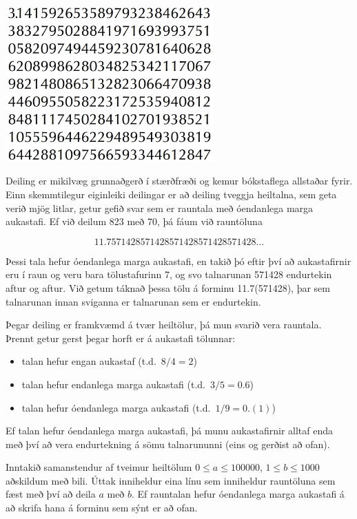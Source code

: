
\includegraphics[width=0.6\textwidth]{pi.jpg}

Deiling er mikilvæg grunnaðgerð í stærðfræði og kemur bókstaflega allstaðar
fyrir. Einn skemmtilegur eiginleiki deilingar er að deiling tveggja heiltalna,
sem geta verið mjög litlar, getur gefið svar sem er rauntala með óendanlega
marga aukastafi. Ef við deilum 823 með 70, þá fáum við rauntöluna

$$11.7571428571428571428571428571428\ldots$$

Þessi tala hefur óendanlega marga aukastafi, en takið þó eftir því að aukastafirnir
eru í raun og veru bara tölustafurinn 7, og svo talnarunan 571428 endurtekin
aftur og aftur. Við getum táknað þessa tölu á forminu 11.7(571428), þar sem
talnarunan innan sviganna er talnarunan sem er endurtekin.

Þegar deiling er framkvæmd á tvær heiltölur, þá mun svarið vera rauntala.
Þrennt getur gerst þegar horft er á aukastafi tölunnar:

\begin{itemize}
\item talan hefur engan aukastaf (t.d.\ $8/4 = 2$)
\item talan hefur endanlega marga aukastafi (t.d.\ $3/5 = 0.6$)
\item talan hefur óendanlega marga aukastafi (t.d.\ $1/9 = 0.(1)$)
\end{itemize}

Ef talan hefur óendanlega marga aukastafi, þá munu aukastafirnir alltaf enda
með því að vera endurtekning á sömu talnarununni (eins og gerðist að ofan).

Inntakið samanstendur af tveimur heiltölum $0 \leq a \leq 100000$, $1 \leq b \leq 1000$ aðskildum með bili. Úttak
inniheldur eina línu sem inniheldur rauntöluna sem fæst með því að deila $a$ með
$b$. Ef rauntalan hefur óendanlega marga aukastafi á að skrifa hana á forminu sem
sýnt er að ofan.
